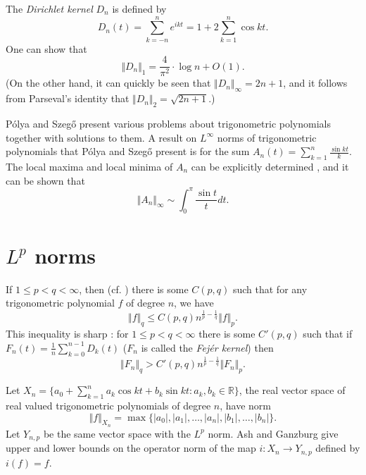 \documentclass{article}
\newcommand{\norm}[1]{\Vert #1 \Vert}
\begin{document}
The {\em Dirichlet kernel} $D_n$ is defined by
\[
D_n(t)=\sum_{k=-n}^n e^{ikt}=1+2\sum_{k=1}^n \cos kt.
\]
One can show \cite[p.~71, Exercise 1.1]{katznelson} that
\[
\norm{D_n}_1 = \frac{4}{\pi^2}\cdot \log n+O(1).
\]
(On the other hand, it can quickly be seen that $\norm{D_n}_\infty=2n+1$, and it follows from Parseval's identity that
$\norm{D_n}_2=\sqrt{2n+1}$.)

P\'olya and Szeg{\H o} \cite[Part VI]{polya} present various problems about trigonometric polynomials together  with solutions to them.
A result on $L^\infty$ norms of trigonometric polynomials that P\'olya and Szeg{\H o} present is for the sum $A_n(t)=\sum_{k=1}^n \frac{\sin kt}{k}$. The local maxima and local minima of $A_n$ can be
explicitly determined \cite[p.~74, no.~23]{polya}, and 
it can be shown that \cite[p.~74, no.~25]{polya}
\[
\norm{A_n}_\infty \sim
\int_0^\pi \frac{\sin t}{t} dt.
\]

\section{$L^p$ norms}
If $1 \leq p < q < \infty$, then  \cite[p.~123, Exercise~1.8]{katznelson} (cf. \cite[p.~102, Theorem 2.6]{devore}) there is some $C(p,q)$ such that for any trigonometric polynomial $f$ of degree $n$, we
have
\[
\norm{f}_q \leq C(p,q) n^{\frac{1}{p}-\frac{1}{q}} \norm{f}_p.
\]
This inequality is sharp  \cite[p.~230]{timan}: for $1 \leq p < q < \infty$ there is some $C'(p,q)$ such that
if $F_n(t)=\frac{1}{n}\sum_{k=0}^{n-1}D_k(t)$ ($F_n$ is called the {\em Fej\'er kernel})  then
\[
\norm{F_n}_q > C'(p,q) n^{\frac{1}{p}-\frac{1}{q}} \norm{F_n}_p.
\]

Let $X_n=\{a_0+\sum_{k=1}^n a_k \cos kt + b_k \sin kt: a_k, b_k \in \mathbb{R}\}$, the real vector space of real valued trigonometric polynomials of degree $n$, have
norm
\[
\norm{f}_{X_n}=\max \{|a_0|, |a_1|,\ldots,|a_n|, |b_1|,\ldots,|b_n|\}.
\]
Let $Y_{n,p}$ be the same vector space with the $L^p$ norm. 
Ash and Ganzburg \cite{MR1458861} give upper and lower bounds on the operator norm of the map $i:X_n \to Y_{n,p}$ defined by $i(f)=f$.
  
\end{document}
